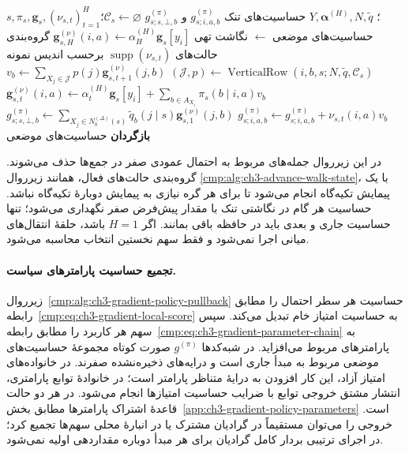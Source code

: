 \begin{algorithm}[!htbp]
\caption{زیرروال $\operatorname{WalkBackward}$: حساسیت احتمال‌های انتخاب ویژگی}
\label{cmp:alg:ch3-gradient-walk-backward}
\begin{algorithmic}[1]
\REQUIRE $s,\pi_s,\mathbf g_s,(\nu_{s,t})_{t=1}^{H}$؛
$Y,\boldsymbol\alpha^{(H)},N,\widetilde q$
\ENSURE حساسیت‌های تنک $g_{s;i,a,b}^{(\pi)}$ و $g_{s;s,\bot,b}^{(\pi)}$
\STATE $\mathcal C_s\gets\varnothing$؛ حساسیت‌های موضعی $\gets$ نگاشت تهی
    \STATE $\mathbf g_{s,H}^{(\nu)}(i,a)\gets\alpha_H^{(H)}\mathbf g_s[y_i]$
\ENDFOR
{}
    \STATE گروه‌بندی حالت‌های $\operatorname{supp}(\nu_{s,t})$ برحسب اندیس نمونه
            \STATE $(\mathcal J,p)\gets
            \operatorname{VerticalRow}(i,b,s;N,\widetilde q,\mathcal C_s)$
            \STATE $v_b\gets\sum_{X_j\in\mathcal J}p(j)
            \mathbf g_{s,t+1}^{(\nu)}(j,b)$
        \ENDFOR
            \STATE $\mathbf g_{s,t}^{(\nu)}(i,a)\gets
            \alpha_t^{(H)}\mathbf g_s[y_i]+\sum_{b\in A_{X_i}}\pi_s(b\mid i,a)v_b$
                \STATE $g_{s;i,a,b}^{(\pi)}\gets
                g_{s;i,a,b}^{(\pi)}+\nu_{s,t}(i,a)v_b$
            \ENDFOR
        \ENDFOR
    \ENDFOR
\ENDFOR
{}
    \STATE $g_{s;s,\bot,b}^{(\pi)}\gets
    \sum_{X_j\in N_b^{(\Delta)}(s)}\widetilde q_b(j\mid s)
    \mathbf g_{s,1}^{(\nu)}(j,b)$
\ENDFOR
\STATE \textbf{بازگردان} حساسیت‌های موضعی
\end{algorithmic}
\end{algorithm}

در این زیرروال جمله‌های مربوط به احتمال
عمودی صفر در جمع‌ها حذف می‌شوند. گروه‌بندی
حالت‌های فعال، همانند زیرروال
\ref{cmp:alg:ch3-advance-walk-state}،
با یک پیمایش تکیه‌گاه انجام می‌شود تا برای
هر گره نیازی به پیمایش دوبارهٔ تکیه‌گاه نباشد.
حساسیت هر گام در نگاشتی تنک با مقدار
پیش‌فرض صفر نگهداری می‌شود؛ تنها
حساسیت جاری و بعدی باید در حافظه باقی
بمانند. اگر $H=1$ باشد، حلقهٔ انتقال‌های
میانی اجرا نمی‌شود و فقط سهم نخستین
انتخاب محاسبه می‌شود.

\paragraph{تجمیع حساسیت پارامترهای سیاست.}
زیرروال~\ref{cmp:alg:ch3-gradient-policy-pullback}
حساسیت هر سطر احتمال را مطابق
رابطه~\eqref{cmp:eq:ch3-gradient-local-score}
به حساسیت امتیاز خام تبدیل می‌کند.
سپس سهم هر کاربرد را مطابق
رابطه~\eqref{cmp:eq:ch3-gradient-parameter-chain}
به پارامترهای مربوط می‌افزاید.
در شبه‌کدها $g^{(\pi)}$ صورت کوتاه
مجموعهٔ حساسیت‌های موضعی مربوط به مبدأ
جاری است و درایه‌های ذخیره‌نشده صفرند.
در خانواده‌های امتیاز آزاد، این کار
افزودن به درایهٔ متناظر پارامتر است؛
در خانوادهٔ توابع پارامتری، انتشار
مشتق خروجی توابع با ضرایب حساسیت
امتیازها انجام می‌شود. در هر دو حالت
قاعدهٔ اشتراک پارامترها مطابق
بخش~\ref{app:ch3-gradient-policy-parameters}
است. خروجی را می‌توان مستقیماً در
گرادیان مشترک یا در انبارهٔ محلی
سهم‌ها تجمیع کرد؛ در اجرای ترتیبی
بردار کامل گرادیان برای هر مبدأ
دوباره مقداردهی اولیه نمی‌شود.

